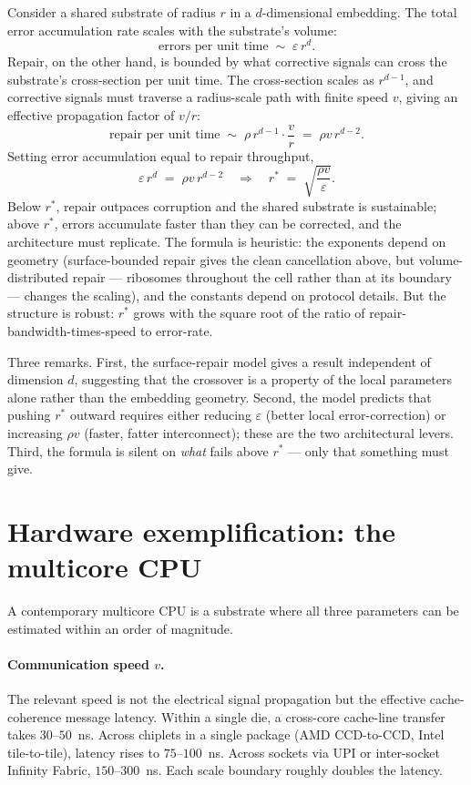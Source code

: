 \documentclass[11pt]{article}
\begin{document}
Consider a shared substrate of radius $r$ in a $d$-dimensional embedding. The total error accumulation rate scales with the substrate's volume:
\[
  \text{errors per unit time} \;\sim\; \varepsilon \, r^{d}.
\]
Repair, on the other hand, is bounded by what corrective signals can cross the substrate's cross-section per unit time. The cross-section scales as $r^{d-1}$, and corrective signals must traverse a radius-scale path with finite speed $v$, giving an effective propagation factor of $v / r$:
\[
  \text{repair per unit time} \;\sim\; \rho \, r^{d-1} \cdot \frac{v}{r} \;=\; \rho v \, r^{d-2}.
\]
Setting error accumulation equal to repair throughput,
\[
  \varepsilon \, r^{d} \;=\; \rho v \, r^{d-2}
  \quad\Longrightarrow\quad
  r^{\ast} \;=\; \sqrt{\frac{\rho v}{\varepsilon}}.
\]
Below $r^{\ast}$, repair outpaces corruption and the shared substrate is sustainable; above $r^{\ast}$, errors accumulate faster than they can be corrected, and the architecture must replicate. The formula is heuristic: the exponents depend on geometry (surface-bounded repair gives the clean cancellation above, but volume-distributed repair --- ribosomes throughout the cell rather than at its boundary --- changes the scaling), and the constants depend on protocol details. But the structure is robust: $r^{\ast}$ grows with the square root of the ratio of repair-bandwidth-times-speed to error-rate.

Three remarks. First, the surface-repair model gives a result independent of dimension $d$, suggesting that the crossover is a property of the local parameters alone rather than the embedding geometry. Second, the model predicts that pushing $r^{\ast}$ outward requires either reducing $\varepsilon$ (better local error-correction) or increasing $\rho v$ (faster, fatter interconnect); these are the two architectural levers. Third, the formula is silent on \emph{what} fails above $r^{\ast}$ --- only that something must give.

\section{Hardware exemplification: the multicore CPU}

A contemporary multicore CPU is a substrate where all three parameters can be estimated within an order of magnitude.

\paragraph{Communication speed $v$.} The relevant speed is not the electrical signal propagation but the effective cache-coherence message latency. Within a single die, a cross-core cache-line transfer takes $30$--$50$~ns. Across chiplets in a single package (AMD CCD-to-CCD, Intel tile-to-tile), latency rises to $75$--$100$~ns. Across sockets via UPI or inter-socket Infinity Fabric, $150$--$300$~ns. Each scale boundary roughly doubles the latency.
\end{document}
